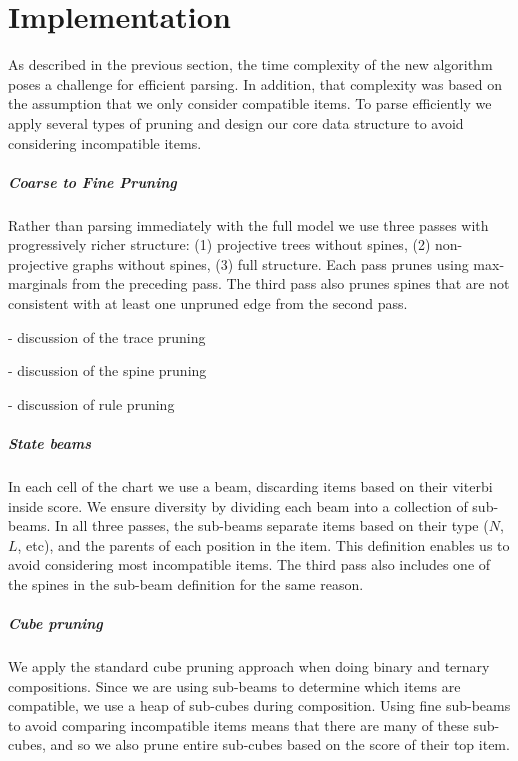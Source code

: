 \chapter{Implementation}

As described in the previous section, the time complexity of the new algorithm poses a challenge for efficient parsing.
In addition, that complexity was based on the assumption that we only consider compatible items.
To parse efficiently we apply several types of pruning and design our core data structure to avoid considering incompatible items.

\paragraph{Coarse to Fine Pruning \parencite{Goodman:1997}}
Rather than parsing immediately with the full model we use three passes with progressively richer structure:
(1) projective trees without spines,
(2) non-projective graphs without spines,
(3) full structure.
Each pass prunes using max-marginals from the preceding pass.
The third pass also prunes spines that are not consistent with at least one unpruned edge from the second pass.

 - discussion of the trace pruning

 - discussion of the spine pruning

 - discussion of rule pruning

\paragraph{State beams}
In each cell of the chart we use a beam, discarding items based on their viterbi inside score.
We ensure diversity by dividing each beam into a collection of sub-beams.
In all three passes, the sub-beams separate items based on their type ($N$, $L$, etc), and the parents of each position in the item.
This definition enables us to avoid considering most incompatible items.
The third pass also includes one of the spines in the sub-beam definition for the same reason.

\paragraph{Cube pruning \parencite{Chiang:2007}}
We apply the standard cube pruning approach when doing binary and ternary compositions.
Since we are using sub-beams to determine which items are compatible, we use a heap of sub-cubes during composition.
Using fine sub-beams to avoid comparing incompatible items means that there are many of these sub-cubes, and so we also prune entire sub-cubes based on the score of their top item.

